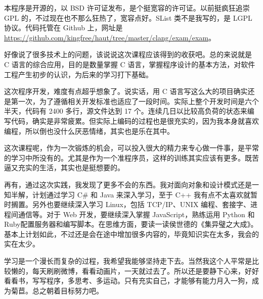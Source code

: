 本程序是开源的，以 BSD 许可证发布，是个挺宽容的许可证。以前挺疯狂追崇 GPL 的，不过现在也不那么狂热了，宽容点好。SList 类不是我写的，是 LGPL 协议。代码托管在 Github 上，网址是 \url{https://github.com/kingfree/haut/tree/master/clang/exam/exam}。

\vspace{1em}

好像说了很多技术上的问题，该说说这次课程应该得到的收获吧。总的来说就是 C 语言的综合应用，目的是数量掌握 C 语言，掌握程序设计的基本方法，对软件工程产生初步的认识，为后来的学习打下基础。

这次程序开发，难度有点超乎想象了。说实话，用 C 语言写这么大的项目确实还是第一次，为了遵循相关开发标准也适应了一段时间。实际上整个开发时间是六个半天，代码有 2400 多行，源文件达到 17 个。连续几日以比较高负荷的状态来编写代码，确实是非常疲累。但实际上编码的过程也是很充实的，因为我本身就喜欢编程，所以倒也没什么厌恶情绪，其实也是乐在其中。

这次课程呢，作为一次锻炼的机会，可以投入很大的精力来专心做一件事，是平常的学习中所没有的。尤其是作为一个准程序员，这样的训练其实应该有更多。既苦逼又充实的生活，其实也是挺想要的。

\vspace{1em}

再有，通过这次实践，我发现了更多不会的东西。我对面向对象和设计模式还是一知半解，计划通过学习 C\# 和 Java 来深入学习，至于 C++ 我有点不太喜欢就暂时搁置。另外也要继续深入学习 Linux，包括 TCP/IP、UNIX 编程、套接字、进程间通信等。对于 Web 开发，要继续深入掌握 JavaScript，熟练运用 Python 和 Ruby配置服务器和编写脚本。在思维方面，要读一读侯世德的《集异璧之大成》。基本上计划如此，不过还是会在途中增加很多内容的，毕竟知识实在太多，我会的实在太少。

学习是一个漫长而复杂的过程，我希望我能够坚持走下去。当然我这个人平常是比较懒的，每天刷刷微博，看看动画片，一天就过去了。所以还是要静下心来，好好看看书，写写程序，多思考、多运动。只有充实自己，才能够有能力月入一狗，成为菊苣。总之朝着目标努力吧。
